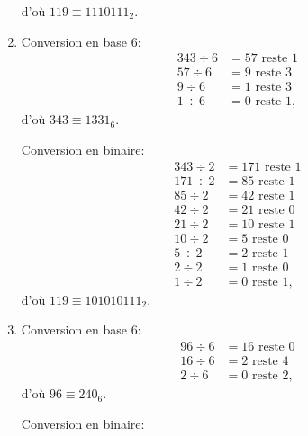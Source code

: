 \begin{exercice}
\begin{sol}
\begin{enumerate}
\begin{minipage}[t]{0.48\linewidth}
        d'où $119 \equiv 1110111_2$.
      \end{minipage}
    \item
      \begin{minipage}[t]{0.48\linewidth}
        Conversion en base 6:
        \begin{align*}
          343 \div 6 &= 57 \text{ reste } 1 \\
           57 \div 6 &= 9 \text{ reste } 3 \\
            9 \div 6 &= 1 \text{ reste } 3 \\
            1 \div 6 &= 0 \text{ reste } 1,
        \end{align*}
        d'où $343 \equiv 1331_6$.
      \end{minipage}
      \hfill
      \begin{minipage}[t]{0.48\linewidth}
        Conversion en binaire:
        \begin{align*}
          343 \div 2 &= 171 \text{ reste } 1 \\
          171 \div 2 &= 85 \text{ reste } 1 \\
           85 \div 2 &= 42 \text{ reste } 1 \\
           42 \div 2 &= 21 \text{ reste } 0 \\
           21 \div 2 &= 10 \text{ reste } 1 \\
           10 \div 2 &= 5 \text{ reste } 0 \\
            5 \div 2 &= 2 \text{ reste } 1 \\
            2 \div 2 &= 1 \text{ reste } 0 \\
            1 \div 2 &= 0 \text{ reste } 1,
        \end{align*}
        d'où $119 \equiv 101010111_2$.
      \end{minipage}
    \item
      \begin{minipage}[t]{0.48\linewidth}
        Conversion en base 6:
        \begin{align*}
          96 \div 6 &= 16 \text{ reste } 0 \\
          16 \div 6 &= 2 \text{ reste } 4 \\
           2 \div 6 &= 0 \text{ reste } 2,
        \end{align*}
        d'où $96 \equiv 240_6$.
      \end{minipage}
      \hfill
      \begin{minipage}[t]{0.48\linewidth}
        Conversion en binaire:
        \begin{align*}

\end{align*}
\end{minipage}
\end{enumerate}
\end{sol}
\end{exercice}

